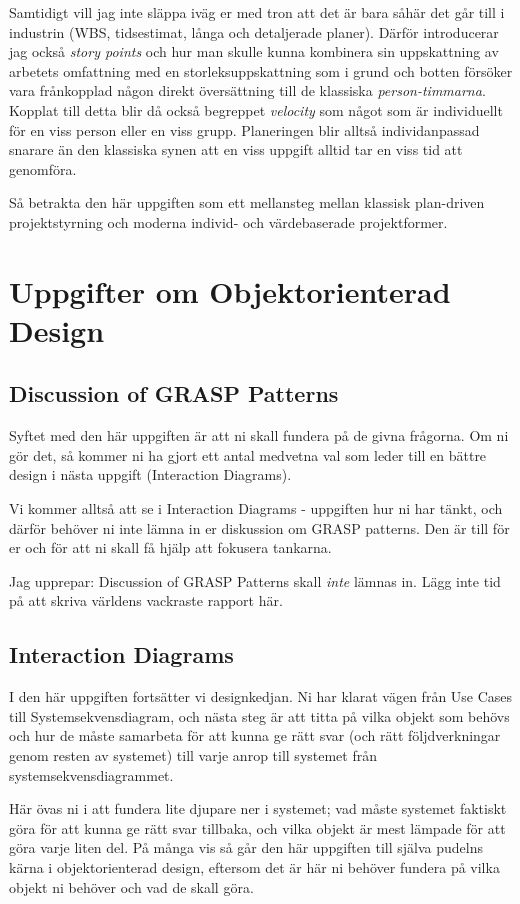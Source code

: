 \documentclass[8pt,oneside]{memoir}
\begin{document}
Samtidigt vill jag inte släppa iväg er med tron att det är bara såhär det går till i industrin (WBS, tidsestimat, långa och detaljerade planer). Därför introducerar jag också \emph{story points} och hur man skulle kunna kombinera sin uppskattning av arbetets omfattning med en storleksuppskattning som i grund och botten försöker vara frånkopplad någon direkt översättning till de klassiska \emph{person-timmarna}. Kopplat till detta blir då också begreppet \emph{velocity} som något som är individuellt för en viss person eller en viss grupp. Planeringen blir alltså individanpassad snarare än den klassiska synen att en viss uppgift alltid tar en viss tid att genomföra.

Så betrakta den här uppgiften som ett mellansteg mellan klassisk plan-driven projektstyrning och moderna individ- och värdebaserade projektformer.
\part{Uppgifter om Objektorienterad Design}
\label{sec:orgc8ea33f}
\chapter{Discussion of GRASP Patterns}
\label{sec:org11e8464}
Syftet med den här uppgiften är att ni skall fundera på de givna frågorna. Om ni gör det, så kommer ni ha gjort ett antal medvetna val som leder till en bättre design i nästa uppgift (Interaction Diagrams).

Vi kommer alltså att se i Interaction Diagrams - uppgiften hur ni har tänkt, och därför behöver ni inte lämna in er diskussion om GRASP patterns. Den är till för er och för att ni skall få hjälp att fokusera tankarna.

Jag upprepar: Discussion of GRASP Patterns skall \emph{inte} lämnas in. Lägg inte tid på att skriva världens vackraste rapport här.
\chapter{Interaction Diagrams}
\label{sec:org9f87587}
I den här uppgiften fortsätter vi designkedjan. Ni har klarat vägen från Use Cases till Systemsekvensdiagram, och nästa steg är att titta på vilka objekt som behövs och hur de måste samarbeta för att kunna ge rätt svar (och rätt följdverkningar genom resten av systemet) till varje anrop till systemet från systemsekvensdiagrammet.

Här övas ni i att fundera lite djupare ner i systemet; vad måste systemet faktiskt göra för att kunna ge rätt svar tillbaka, och vilka objekt är mest lämpade för att göra varje liten del. På många vis så går den här uppgiften till själva pudelns kärna i objektorienterad design, eftersom det är här ni behöver fundera på vilka objekt ni behöver och vad de skall göra.
\end{document}
